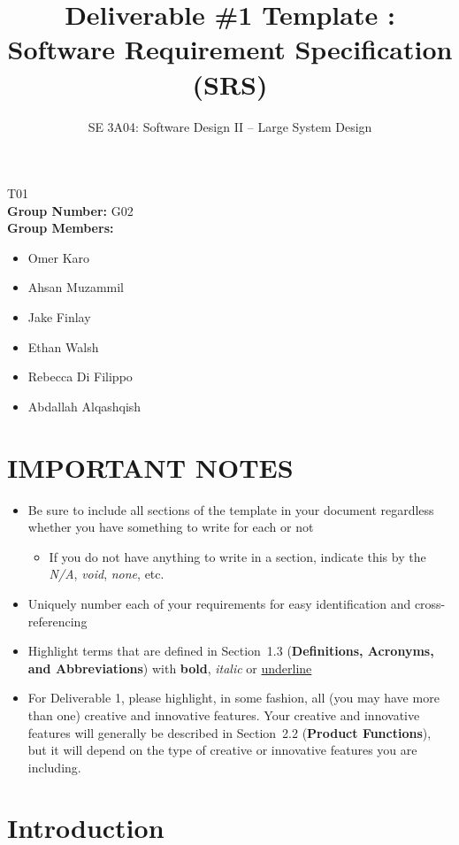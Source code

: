 \documentclass[]{article}
\title{Deliverable \#1 Template : Software Requirement Specification (SRS)}
\author{SE 3A04: Software Design II -- Large System Design}
\date{}
\begin{document}
\maketitle	
{} T01\\
{\bf Group Number:} G02 \\
{\bf Group Members:} 
\begin{itemize}
	\item Omer Karo
	\item Ahsan Muzammil
	\item Jake Finlay
	\item Ethan Walsh
	\item Rebecca Di Filippo
	\item Abdallah Alqashqish
\end{itemize}

\section*{IMPORTANT NOTES}
\begin{itemize}
	\item Be sure to include all sections of the template in your document regardless whether you have something to write for each or not
	\begin{itemize}
		\item If you do not have anything to write in a section, indicate this by the \emph{N/A}, \emph{void}, \emph{none}, etc.
	\end{itemize}
	\item Uniquely number each of your requirements for easy identification and cross-referencing
	\item Highlight terms that are defined in Section~1.3 (\textbf{Definitions, Acronyms, and Abbreviations}) with \textbf{bold}, \emph{italic} or \underline{underline}
	\item For Deliverable 1, please highlight, in some fashion, all (you may have more than one) creative and innovative features. Your creative and innovative features will generally be described in Section~2.2 (\textbf{Product Functions}), but it will depend on the type of creative or innovative features you are including.
\end{itemize}

\newpage
\section{Introduction}
\label{sec:introduction}
\end{document}
